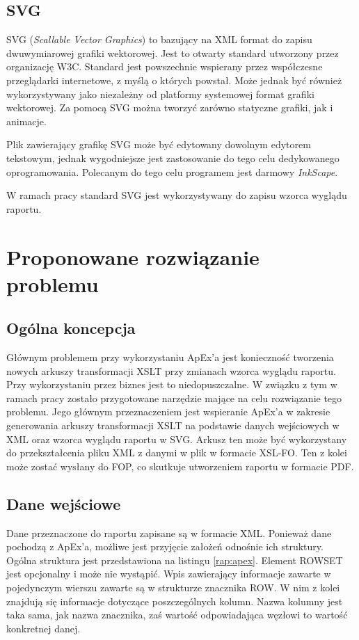 \documentclass[11pt,a4paper]{article}
\begin{document}
\subsection{SVG} \label{tools:svg}
SVG (\emph{Scallable Vector Graphics}) to bazujący na XML format do zapisu dwuwymiarowej grafiki wektorowej. Jest to otwarty standard utworzony przez organizację W3C. Standard jest powszechnie wspierany przez współczesne przeglądarki internetowe, z myślą o których powstał. Może jednak być również wykorzystywany jako niezależny od platformy systemowej format grafiki wektorowej. Za pomocą SVG można tworzyć zarówno statyczne grafiki, jak i animacje.

Plik zawierający grafikę SVG może być edytowany dowolnym edytorem tekstowym, jednak wygodniejsze jest zastosowanie do tego celu dedykowanego oprogramowania. Polecanym do tego celu programem jest darmowy \emph{InkScape}.

W ramach pracy standard SVG jest wykorzystywany do zapisu wzorca wyglądu raportu. 
\newpage


\section{Proponowane rozwiązanie problemu} \label{sec:solution}
\subsection{Ogólna koncepcja} \label{solution:koncept}
Głównym problemem przy wykorzystaniu ApEx'a jest konieczność tworzenia nowych arkuszy transformacji XSLT przy zmianach wzorca wyglądu raportu. Przy wykorzystaniu przez biznes jest to niedopuszczalne. W związku z tym w ramach pracy zostało przygotowane narzędzie mające na celu rozwiązanie tego problemu. Jego głównym przeznaczeniem jest wspieranie ApEx'a w zakresie generowania arkuszy transformacji XSLT na podstawie danych wejściowych w XML oraz wzorca wyglądu raportu w SVG. Arkusz ten może być wykorzystany do przekształcenia pliku XML z danymi w plik w formacie XSL-FO. Ten z kolei może zostać wysłany do FOP, co skutkuje utworzeniem raportu w formacie PDF.

\subsection{Dane wejściowe} \label{solution:data}
Dane przeznaczone do raportu zapisane są w formacie XML. Ponieważ dane pochodzą z ApEx'a, możliwe jest przyjęcie założeń odnośnie ich struktury. Ogólna struktura jest przedstawiona na listingu \ref{rap:apex}. Element ROWSET jest opcjonalny i może nie wystąpić. Wpis zawierający informacje zawarte w pojedynczym wierszu zawarte są w strukturze znacznika ROW. W nim z kolei znajdują się informacje dotyczące poszczególnych kolumn. Nazwa kolumny jest taka sama, jak nazwa znacznika, zaś wartość odpowiadająca węzłowi to wartość konkretnej danej.
\end{document}
